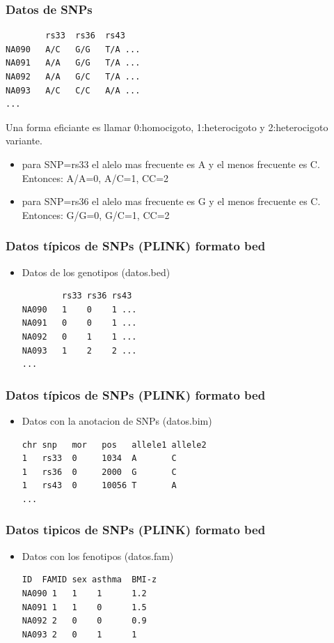 \documentclass{beamer}\usepackage[]{graphicx}\usepackage[]{color}
\begin{document}
\begin{frame}[fragile]
\frametitle{Datos de SNPs}


\begin{verbatim}
        rs33  rs36  rs43
NA090   A/C   G/G   T/A ...
NA091   A/A   G/G   T/A ...
NA092   A/A   G/C   T/A ...
NA093   A/C   C/C   A/A ...
...
\end{verbatim}
Una forma eficiante es llamar 0:homocigoto, 1:heterocigoto y 2:heterocigoto variante.

\begin{itemize}
\item para SNP=rs33 el alelo mas frecuente es A y el menos frecuente es C. \newline Entonces:  A/A=0, A/C=1, CC=2
\item para SNP=rs36 el alelo mas frecuente es G y el menos frecuente es C. \newline Entonces:  G/G=0, G/C=1, CC=2

\end{itemize}
\end{frame}



\begin{frame}[fragile]
\frametitle{Datos t\'ipicos de SNPs (PLINK) formato bed}
\begin{itemize}
\item Datos de los genotipos (datos.bed)
\begin{verbatim}
        rs33 rs36 rs43
NA090   1    0    1 ...
NA091   0    0    1 ...
NA092   0    1    1 ...
NA093   1    2    2 ...
...
\end{verbatim}
\end{itemize}
\end{frame}

\begin{frame}[fragile]
\frametitle{Datos t\'ipicos de SNPs (PLINK) formato bed}
\begin{itemize}
\item Datos con la anotacion de SNPs (datos.bim)
\begin{verbatim}
chr snp   mor   pos   allele1 allele2
1   rs33  0     1034  A       C
1   rs36  0     2000  G       C
1   rs43  0     10056 T       A 
...
\end{verbatim}
\end{itemize}
\end{frame}

\begin{frame}[fragile]
\frametitle{Datos tipicos de SNPs (PLINK) formato bed}
\begin{itemize}
\item Datos con los fenotipos (datos.fam)
\begin{verbatim}
ID  FAMID sex asthma  BMI-z
NA090 1   1    1      1.2
NA091 1   1    0      1.5
NA092 2   0    0      0.9
NA093 2   0    1      1
\end{verbatim}

\end{itemize}
\end{frame}
\end{document}
